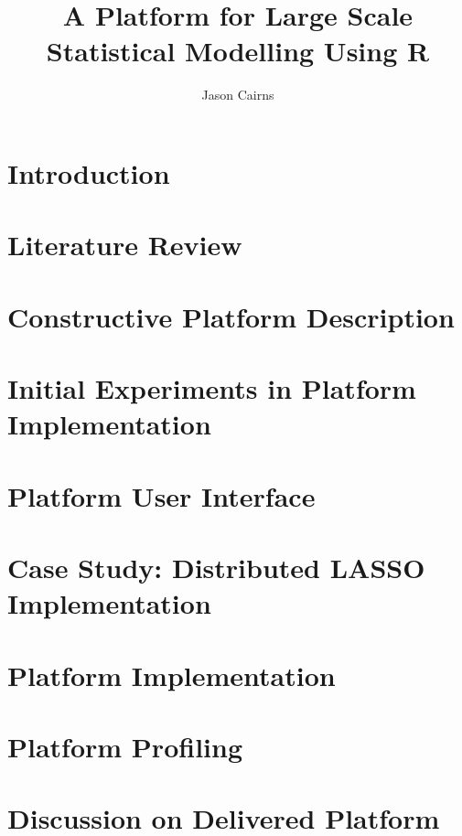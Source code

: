 \documentclass[11pt,a4paper,partial,examcopy]{aucklandthesis} %
\title{A Platform for Large Scale Statistical Modelling Using R}
\author{Jason Cairns}
\begin{document}


\chapter{Introduction}\label{ch:introduction}


\chapter{Literature Review}\label{ch:lit-review}


\chapter{Constructive Platform Description}\label{ch:constructive-description}


\chapter{Initial Experiments in Platform Implementation}\label{ch:initial-experiments}


\chapter{Platform User Interface}\label{ch:ui}


\chapter{Case Study: Distributed LASSO Implementation}\label{ch:lasso}


\chapter{Platform Implementation}\label{ch:implementation}


\chapter{Platform Profiling}\label{ch:profiling}


\chapter{Discussion on Delivered Platform}\label{ch:discussion}


\appendix

\printbibliography
\end{document}
